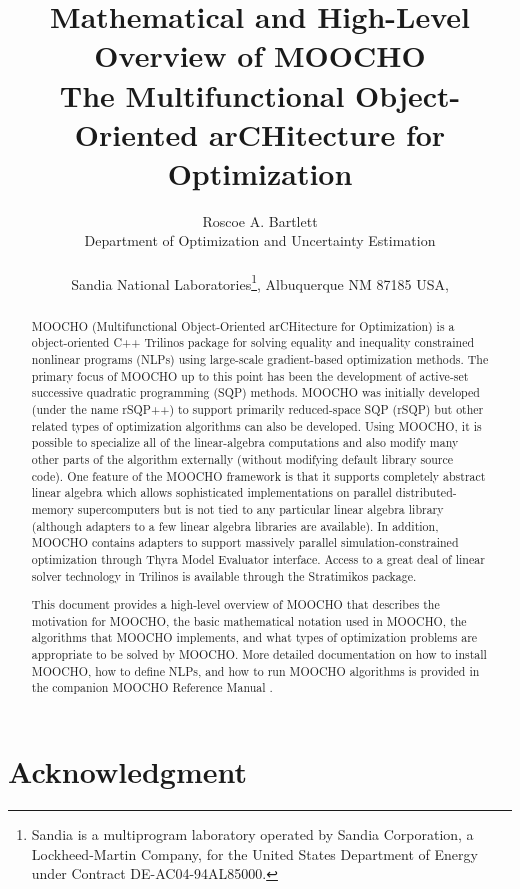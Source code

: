 \documentclass[pdf,12pt,report]{SANDreport}
\title{
\center
Mathematical and High-Level Overview of MOOCHO \\[2ex]
The Multifunctional Object-Oriented arCHitecture for Optimization
}
\author{
Roscoe A. Bartlett \\ Department of Optimization and Uncertainty Estimation \\ \\
Sandia National Laboratories\footnote{ Sandia is a multiprogram laboratory
operated by Sandia Corporation, a Lockheed-Martin Company, for the United States
Department of Energy under Contract DE-AC04-94AL85000.},
Albuquerque NM 87185 USA, \\ }
\date{}
\begin{document}
\maketitle

%

%
\begin{abstract}
%

MOOCHO (Multifunctional Object-Oriented arCHitecture for Optimization) is a
object-oriented C++ Trilinos package for solving equality and inequality
constrained nonlinear programs (NLPs) using large-scale gradient-based
optimization methods.  The primary focus of MOOCHO up to this point has been
the development of active-set successive quadratic programming (SQP) methods.
MOOCHO was initially developed (under the name rSQP++) to support primarily
reduced-space SQP (rSQP) but other related types of optimization algorithms
can also be developed.  Using MOOCHO, it is possible to specialize all of the
linear-algebra computations and also modify many other parts of the algorithm
externally (without modifying default library source code).  One feature of
the MOOCHO framework is that it supports completely abstract linear algebra
which allows sophisticated implementations on parallel distributed-memory
supercomputers but is not tied to any particular linear algebra library
(although adapters to a few linear algebra libraries are available).  In
addition, MOOCHO contains adapters to support massively parallel
simulation-constrained optimization through Thyra Model Evaluator interface.
Access to a great deal of linear solver technology in Trilinos is available
through the Stratimikos package.

This document provides a high-level overview of MOOCHO that describes the
motivation for MOOCHO, the basic mathematical notation used in MOOCHO, the
algorithms that MOOCHO implements, and what types of optimization problems are
appropriate to be solved by MOOCHO.  More detailed documentation on how to
install MOOCHO, how to define NLPs, and how to run MOOCHO algorithms is
provided in the companion MOOCHO Reference Manual {}\cite{ref:moochorefguide}.

%
\end{abstract}
%


%
\clearpage
\section*{Acknowledgment}
\end{document}
